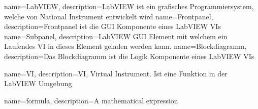 

{
	name=LabVIEW,
	description={LabVIEW ist ein grafisches Programmiersystem, welche von National Instrument entwickelt wird}
}
{
	name=Frontpanel,
	description={Frontpanel ist die GUI Komponente eines LabVIEW \gls{VI}s}
}
{
name=Subpanel,
description={\gls{LabVIEW} GUI Element mit welchem ein Laufendes \gls{VI} in dieses Element geladen werden kann.}
}
{
name=Blockdiagramm,
description={Das Blockdiagramm ist die Logik Komponente eines LabVIEW \gls{VI}s}
}

{
	name=VI,
	description={VI, Virtual Instrument. Ist eine Funktion in der LabVIEW Umgebung}
}



{
	name=formula,
	description={A mathematical expression}
}